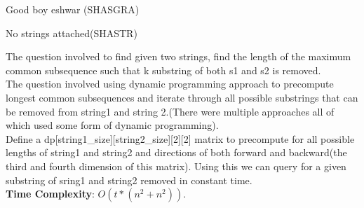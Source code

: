 \documentclass[solution,addpoints,12pt]{exam}
\begin{document}
\begin{questions}
\question
  Good boy eshwar (SHASGRA)

\begin{solution}
 
\end{solution}

\question
  No strings attached(SHASTR)
  
  \begin{solution}
    The question involved to find given two strings, find the length of the maximum common subsequence such that k substring of both s1 and s2 
    is removed. \\
    
    The question involved using dynamic programming approach to precompute longest common subsequences and iterate through all possible substrings
    that can be removed from string1 and string 2.(There were multiple approaches all of which used some form of dynamic programming). \\
    
    Define a dp[string1\_size][string2\_size][2][2] matrix to precompute for all possible lengths of string1 and string2 and directions of both forward 
    and backward(the third and fourth dimension of this matrix). Using this we can query for a given substring of sring1 and string2 removed in
    constant time. \\
    
    \textbf{Time Complexity}: $O(t \ast (n^2 + n^2))$. \\
     
     
  
  \end{solution}



\end{questions}
\end{document}
